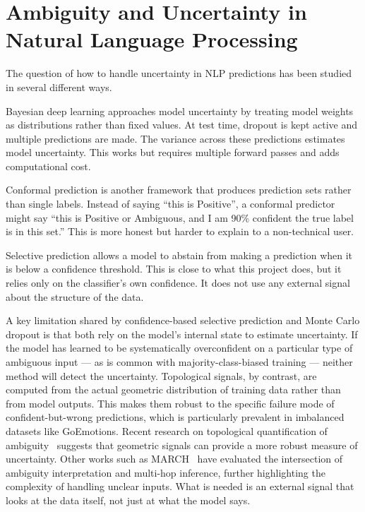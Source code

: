 \section{Ambiguity and Uncertainty in Natural Language Processing}

The question of how to handle uncertainty in NLP predictions has been studied in several
different ways.

Bayesian deep learning approaches model uncertainty by treating model weights as
distributions rather than fixed values. At test time, dropout is kept active and multiple predictions
are made. The variance across these predictions estimates model uncertainty. This works but
requires multiple forward passes and adds computational cost.

Conformal prediction is another framework that produces prediction sets rather than single
labels. Instead of saying ``this is Positive'', a conformal predictor might say ``this is Positive or
Ambiguous, and I am 90\% confident the true label is in this set.'' This is more honest but
harder to explain to a non-technical user.

Selective prediction allows a model to abstain from making a prediction when it is below
a confidence threshold. This is close to what this project does, but it relies only on the
classifier's own confidence. It does not use any external signal about the structure of the data.

A key limitation shared by confidence-based selective prediction and Monte Carlo dropout is that both rely on the model's internal state to estimate uncertainty. If the model has learned to be systematically overconfident on a particular type of ambiguous input — as is common with majority-class-biased training — neither method will detect the uncertainty.
Topological signals, by contrast, are computed from the actual geometric distribution of training data rather than from model outputs. This makes them robust to the specific failure mode of confident-but-wrong predictions, which is particularly prevalent in imbalanced datasets like GoEmotions. Recent research on topological quantification of ambiguity~\cite{tda_ambiguity, blowfish} suggests
that geometric signals can provide a more robust measure of uncertainty. Other works such as
MARCH~\cite{march} have evaluated the intersection of ambiguity interpretation and
multi-hop inference, further highlighting the complexity of handling unclear inputs.
What is needed is an external signal that looks at the data itself, not just at what the model says.

